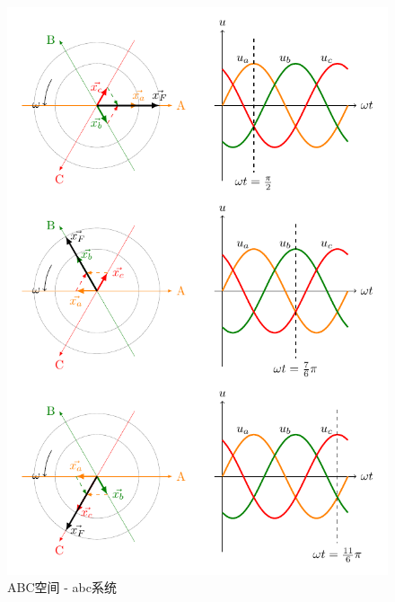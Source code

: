 \documentclass{ctexart}
\numberwithin{equation}{section}
\begin{document}
\begin{figure}[hbtp]
\centering
\begin{minipage}[b]{0.48\linewidth}
\centering
\includegraphics[width = \linewidth]{ABC-vector-space.pdf}
\caption{ABC空间 - abc系统}
\label{abc-space}
\end{minipage}
\hspace{10pt}
\begin{minipage}[b]{0.48\linewidth}
\centering

\end{minipage}
\end{figure}
\end{document}
